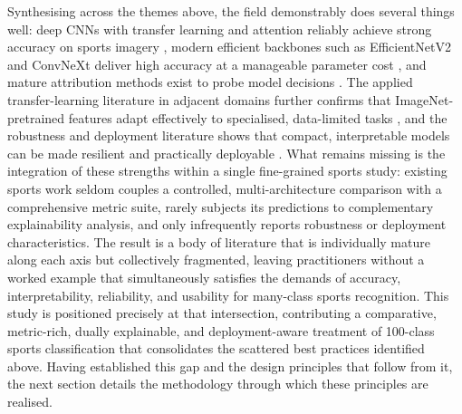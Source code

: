 Synthesising across the themes above, the field demonstrably does several things well: deep CNNs with transfer learning and attention reliably achieve strong accuracy on sports imagery \citep{liu2024comparison,li2024seres,zhou2024tuna}, modern efficient backbones such as EfficientNetV2 and ConvNeXt deliver high accuracy at a manageable parameter cost \citep{tan2021efficientnetv2,liu2022convnext}, and mature attribution methods exist to probe model decisions \citep{selvaraju2017gradcam,lundberg2017shap}.
The applied transfer-learning literature in adjacent domains further confirms that ImageNet-pretrained features adapt effectively to specialised, data-limited tasks \citep{alotaibi2024gastro,manole2024dermatology}, and the robustness and deployment literature shows that compact, interpretable models can be made resilient and practically deployable \citep{siedel2023corruption,karim2024grapeleaf}.
What remains missing is the integration of these strengths within a single fine-grained sports study: existing sports work seldom couples a controlled, multi-architecture comparison with a comprehensive metric suite, rarely subjects its predictions to complementary explainability analysis, and only infrequently reports robustness or deployment characteristics.
The result is a body of literature that is individually mature along each axis but collectively fragmented, leaving practitioners without a worked example that simultaneously satisfies the demands of accuracy, interpretability, reliability, and usability for many-class sports recognition.
This study is positioned precisely at that intersection, contributing a comparative, metric-rich, dually explainable, and deployment-aware treatment of 100-class sports classification that consolidates the scattered best practices identified above.
Having established this gap and the design principles that follow from it, the next section details the methodology through which these principles are realised.
